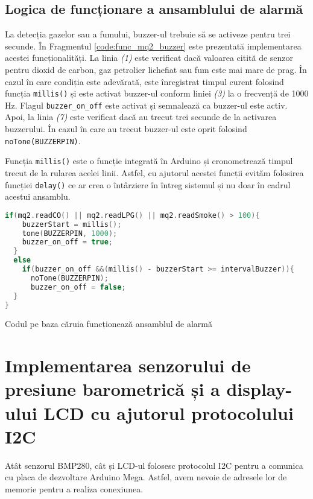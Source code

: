 \subsection{Logica de funcționare a ansamblului de alarmă}
La detecția gazelor sau a fumului, buzzer-ul trebuie să se activeze pentru trei secunde. În Fragmentul \ref{code:func_mq2_buzzer} este prezentată implementarea acestei funcționalități. La linia \textit{(1)} este verificat dacă valoarea citită de senzor pentru dioxid de carbon, gaz petrolier lichefiat sau fum este mai mare de prag. În cazul în care condiția este adevărată, este înregistrat timpul curent folosind funcția \texttt{millis()} și este activat buzzer-ul conform liniei \textit{(3)} la o frecvență de 1000 Hz. Flagul \texttt{buzzer\_on\_off} este activat și semnalează ca buzzer-ul este activ. Apoi, la linia \textit{(7)} este verificat dacă au trecut trei secunde de la activarea buzzerului. În cazul în care au trecut buzzer-ul este oprit folosind \texttt{noTone(BUZZERPIN)}.

Funcția \texttt{millis()} este o funcție integrată în Arduino și cronometrează timpul trecut de la rularea acelei linii. Astfel, cu ajutorul acestei funcții evităm folosirea funcției \texttt{delay()} ce ar crea o întârziere în întreg sistemul și nu doar în cadrul acestui ansamblu.

\begin{code}[H]
\begin{lstlisting}[language=C++]
  if(mq2.readCO() || mq2.readLPG() || mq2.readSmoke() > 100){
    buzzerStart = millis();
    tone(BUZZERPIN, 1000); 
    buzzer_on_off = true;
  }
  else
    if(buzzer_on_off &&(millis() - buzzerStart >= intervalBuzzer)){
      noTone(BUZZERPIN);
      buzzer_on_off = false;
  }
}
\end{lstlisting}
\caption{Codul pe baza căruia funcționează ansamblul de alarmă}
\label{code:func_mq2_buzzer}
\end{code}

\section{Implementarea senzorului de presiune barometrică și a display-ului LCD cu ajutorul protocolului I2C}
Atât senzorul BMP280, cât și LCD-ul folosesc protocolul I2C pentru a comunica cu placa de dezvoltare Arduino Mega. Astfel, avem nevoie de adresele lor de memorie pentru a realiza conexiunea.

